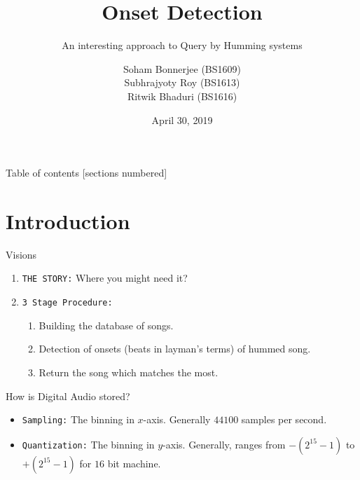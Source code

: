 \documentclass[10pt]{beamer}
\title{Onset Detection}
\subtitle{An interesting approach to Query by Humming systems}
\date{April 30, 2019}
\author{
Soham Bonnerjee (BS1609)\\
Subhrajyoty Roy (BS1613)\\
Ritwik Bhaduri (BS1616)}
\institute{B.Stat., Indian Statistical Insitute, Kolkata}
\begin{document}
\maketitle

\begin{frame}{Table of contents}
  [sections numbered]
  \tableofcontents[hideallsubsections]
\end{frame}

\section{Introduction}

\begin{frame}[fragile]{Visions}
\begin{enumerate}
    \item \texttt{THE STORY:} Where you might need it?
    \pause
    \item \texttt{3 Stage Procedure:}
    \begin{enumerate}
        \item Building the database of songs.
        \item Detection of onsets (beats in layman's terms) of hummed song.
        \item Return the song which matches the most.
    \end{enumerate}
\end{enumerate}

\end{frame}

\begin{frame}{How is Digital Audio stored?}
    \begin{itemize}
        \item \texttt{Sampling:} The binning in $x$-axis. Generally $44100$ samples per second.
        \item \texttt{Quantization:} The binning in $y$-axis. Generally, ranges from $-(2^{15}-1)$ to $+(2^{15} -1)$ for $16$ bit machine.
    \end{itemize}
\end{frame}
\end{document}
